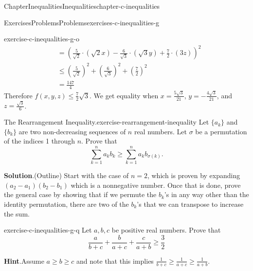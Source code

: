 \documentclass[oneside,10pt,]{book}
\newcommand{\blocktitlefont}{\relax}
\numberwithin{equation}{section}
\begin{document}
\begin{chapterptx}{Chapter}{Inequalities}{}{Inequalities}{}{}{chapter-c-inequalities}
\begin{exercises-section}{Exercises}{Problems}{}{Problems}{}{}{exercises-c-inequalities-g}
\begin{divisionexercise}{14}{}{}{exercise-c-inequalities-g-o}
\begin{equation*}
\begin{split}
& = (\frac{5}{\sqrt{2}}\cdot(\sqrt{2} x) - \frac{6}{\sqrt{3}}\cdot(\sqrt{3} y)+\frac{7}{2}\cdot (3 z))^2\\
& \leq \left(\frac{5}{\sqrt{2}}\right)^2+\left(\frac{6}{\sqrt{3}}\right)^2+\left(\frac{7}{2}\right)^2\\
& = \frac{147}{4}
\end{split}
\end{equation*}
Therefore \(f(x,y,z)\leq \frac{7}{2} \sqrt{3}\).  We get equality when \(x=\frac{5\sqrt{3}}{21}\), \(y=-\frac{4\sqrt{3}}{21}\), and \(z=\frac{\sqrt{3}}{6}\).%
\end{divisionexercise}%
\begin{divisionexercise}{15}{The Rearrangement Inequality.}{}{exercise-rearrangement-inequality}%
%
Let \(\{a_k\}\) and \(\{b_k\}\) are two non-decreasing sequences of \(n\) real numbers.  Let \(\sigma\) be a permutation of the indices 1 through \(n\).  Prove that%
\begin{equation*}
\sum_{k=1}^n a_k b_k \ge \sum_{k=1}^n a_k b_{\sigma(k)}.
\end{equation*}
%
\par\smallskip%
\noindent\textbf{\blocktitlefont Solution}.\hypertarget{solution-rearrangement-inequality-d}{}\quad{}(Outline)  Start with the case of \(n=2\), which is proven by expanding \((a_2 - a_1)(b_2-b_1)\) which is a nonnegative number.  Once that is done, prove the general case by showing that if we permute the \(b_k\)'s in any way other than the identity permutation, there are two of the \(b_k\)'s that we can transpose to increase the sum.%
\end{divisionexercise}%
\begin{divisionexercise}{16}{}{}{exercise-c-inequalities-g-q}%
Let \(a, b, c\) be positive real numbers.  Prove that%
\begin{equation*}
\frac{a}{b+c} + \frac{b}{a+c}+ \frac{c}{a+b} \ge \frac{3}{2}
\end{equation*}
%
\par\smallskip%
\noindent\textbf{\blocktitlefont Hint}.\hypertarget{hint-c-inequalities-g-q-b}{}\quad{}Assume \(a \ge b \ge c\) and note that this implies \(\frac{1}{b+c} \ge \frac{1}{a+c} \ge \frac{1}{a+b}\).%
\end{divisionexercise}%
\end{exercises-section}
\end{chapterptx}
%
%
\typeout{************************************************}
\typeout{************************************************}
\end{document}
